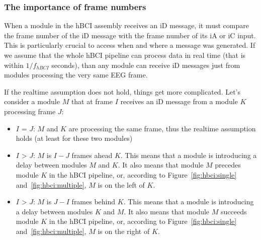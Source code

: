 \documentclass[a4paper,10pt]{article}
\begin{document}
\subsubsection*{The importance of frame numbers}
When a module in the hBCI assembly receives an iD message, it must compare the
frame number of the iD message with the frame number of its iA or iC input.
This is particularly crucial to access when and where a message was generated.
If we assume that the whole hBCI pipeline can process data in real time (that is
within $1/f_{hBCI}$ seconds), than any module can receive iD messages just from
modules processing the very same EEG frame.

If the realtime assumption does not hold, things get more complicated. Let's
consider a module $M$ that at frame $I$ receives an iD message from a module
$K$ processing frame $J$:
\begin{itemize}
  \item $I$ = $J$: $M$ and $K$ are processing the same frame, thus the 
  realtime assumption holds (at least for these two modules)
  \item $I$ > $J$: $M$ is $I-J$ frames ahead $K$. This means that a module is
  introducing a delay between modules $M$ and $K$. It also means that module $M$
  precedes module $K$ in the hBCI pipeline, or, according to
  Figure~\ref{fig:hbci:single} and~\ref{fig:hbci:multiple}, $M$ is on the left
  of $K$.
  \item $I$ > $J$: $M$ is $J-I$ frames behind $K$. This means that a module is
  introducing a delay between modules $K$ and $M$. It also means that module $M$
  succeeds module $K$ in the hBCI pipeline, or, according to
  Figure~\ref{fig:hbci:single} and~\ref{fig:hbci:multiple}, $M$ is on the right
  of $K$.
\end{itemize}
\end{document}
